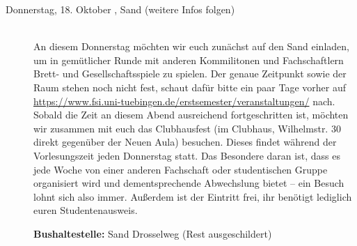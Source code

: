 \begin{description}
\item[Donnerstag, 18. Oktober \Jahr,  Sand (weitere Infos folgen)]\ \\
An diesem Donnerstag möchten wir euch zunächst auf den Sand einladen, um in gemütlicher Runde mit anderen Kommilitonen und Fachschaftlern Brett- und Gesellschaftsspiele zu spielen. Der genaue Zeitpunkt sowie der Raum stehen noch nicht fest, schaut dafür bitte ein paar Tage vorher auf \url{https://www.fsi.uni-tuebingen.de/erstsemester/veranstaltungen/} nach.\\ Sobald die Zeit an diesem Abend ausreichend fortgeschritten ist, möchten wir zusammen mit euch das Clubhausfest (im Clubhaus, Wilhelmstr. 30 direkt gegenüber der Neuen Aula) besuchen. Dieses findet während der Vorlesungszeit jeden Donnerstag statt. Das Besondere daran ist, dass es jede Woche von einer anderen Fachschaft oder studentischen Gruppe organisiert wird und dementsprechende Abwechslung bietet -- ein Besuch lohnt sich also immer. Außerdem ist der Eintritt frei, ihr benötigt lediglich euren Studentenausweis.

\textbf{Bushaltestelle:} Sand Drosselweg (Rest ausgeschildert)

 
\end{description}
